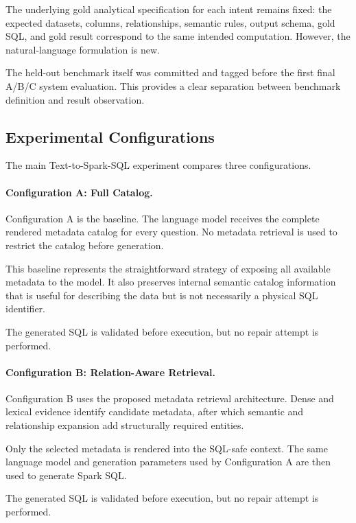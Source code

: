 The underlying gold analytical specification for each intent remains fixed:
the expected datasets, columns, relationships, semantic rules, output schema,
gold SQL, and gold result correspond to the same intended computation.
However, the natural-language formulation is new.

The held-out benchmark itself was committed and tagged before the first final
A/B/C system evaluation. This provides a clear separation between benchmark
definition and result observation.


\subsection{Experimental Configurations}

The main Text-to-Spark-SQL experiment compares three configurations.

\paragraph{Configuration A: Full Catalog.}

Configuration A is the baseline. The language model receives the complete
rendered metadata catalog for every question. No metadata retrieval is used to
restrict the catalog before generation.

This baseline represents the straightforward strategy of exposing all
available metadata to the model. It also preserves internal semantic catalog
information that is useful for describing the data but is not necessarily a
physical SQL identifier.

The generated SQL is validated before execution, but no repair attempt is
performed.

\paragraph{Configuration B: Relation-Aware Retrieval.}

Configuration B uses the proposed metadata retrieval architecture. Dense and
lexical evidence identify candidate metadata, after which semantic and
relationship expansion add structurally required entities.

Only the selected metadata is rendered into the SQL-safe context. The same
language model and generation parameters used by Configuration A are then used
to generate Spark SQL.

The generated SQL is validated before execution, but no repair attempt is
performed.

